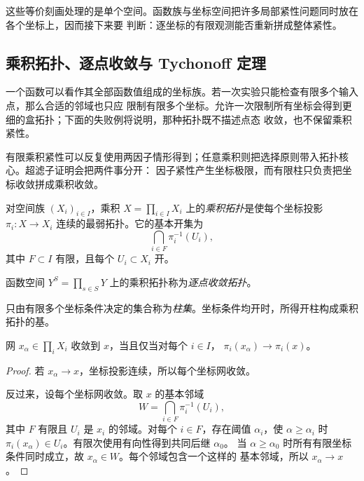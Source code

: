 这些等价刻画处理的是单个空间。函数族与坐标空间把许多局部紧性问题同时放在各个坐标上，因而接下来要
判断：逐坐标的有限观测能否重新拼成整体紧性。

\subsection{乘积拓扑、逐点收敛与 Tychonoff 定理}\label{subsec:1-2-2}

一个函数可以看作其全部函数值组成的坐标族。若一次实验只能检查有限多个输入点，那么合适的邻域也只应
限制有限多个坐标。允许一次限制所有坐标会得到更细的盒拓扑；下面的失败例将说明，那种拓扑既不描述点态
收敛，也不保留乘积紧性。

\begin{remark}
有限乘积紧性可以反复使用两因子情形得到；任意乘积则把选择原则带入拓扑核心。超滤子证明会把两件事分开：
因子紧性产生坐标极限，而有限柱只负责把坐标收敛拼成乘积收敛。
\end{remark}

\begin{definition}[乘积拓扑]\label{def:1-2-2-1}
对空间族 \((X_i)_{i\in I}\)，乘积 \(X=\prod_{i\in I}X_i\) 上的\emph{乘积拓扑}是使每个坐标投影
\(\pi_i:X\to X_i\) 连续的最弱拓扑。它的基本开集为
\[
 \bigcap_{i\in F}\pi_i^{-1}(U_i),
\]
其中 \(F\subset I\) 有限，且每个 \(U_i\subset X_i\) 开。
\end{definition}

\begin{definition}[逐点收敛拓扑]\label{def:1-2-2-2}
函数空间 \(Y^S=\prod_{s\in S}Y\) 上的乘积拓扑称为\emph{逐点收敛拓扑}。
\end{definition}

\begin{definition}[柱集]\label{def:1-2-2-3}
只由有限多个坐标条件决定的集合称为\emph{柱集}。坐标条件均开时，所得开柱构成乘积拓扑的基。
\end{definition}

\begin{theorem}[逐坐标收敛判别]\label{theorem:1-2-2-1}
网 \(x_\alpha\in\prod_iX_i\) 收敛到 \(x\)，当且仅当对每个 \(i\in I\)，
\(\pi_i(x_\alpha)\to\pi_i(x)\)。
\end{theorem}
\begin{proof}
若 \(x_\alpha\to x\)，坐标投影连续，所以每个坐标网收敛。

反过来，设每个坐标网收敛。取 \(x\) 的基本邻域
\[
 W=\bigcap_{i\in F}\pi_i^{-1}(U_i),
\]
其中 \(F\) 有限且 \(U_i\) 是 \(x_i\) 的邻域。对每个 \(i\in F\)，存在阈值 \(\alpha_i\)，使
\(\alpha\ge\alpha_i\) 时 \(\pi_i(x_\alpha)\in U_i\)。有限次使用有向性得到共同后继 \(\alpha_0\)。
当 \(\alpha\ge\alpha_0\) 时所有有限坐标条件同时成立，故 \(x_\alpha\in W\)。每个邻域包含一个这样的
基本邻域，所以 \(x_\alpha\to x\)。
\end{proof}

